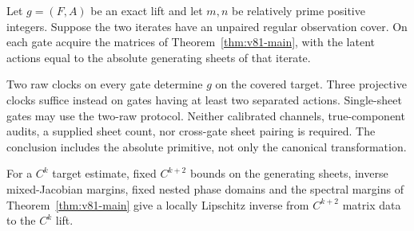 \begin{theorem}
\label{thm:v81-unpaired}
Let $g=(F,A)$ be an exact lift and let $m,n$ be relatively prime positive
integers.  Suppose the two iterates have an unpaired regular observation
cover.  On each gate acquire the matrices of
Theorem~\ref{thm:v81-main}, with the latent actions equal to the absolute
generating sheets of that iterate.

Two raw clocks on every gate determine $g$ on the covered target.  Three
projective clocks suffice instead on gates having at least two separated
actions.  Single-sheet gates may use the two-raw protocol.  Neither
calibrated channels, true-component audits, a supplied sheet count, nor
cross-gate sheet pairing is required.  The conclusion includes the
absolute primitive, not only the canonical transformation.

For a $C^k$ target estimate, fixed $C^{k+2}$ bounds on the generating
sheets, inverse mixed-Jacobian margins, fixed nested phase domains and
the spectral margins of Theorem~\ref{thm:v81-main} give a locally
Lipschitz inverse from $C^{k+2}$ matrix data to the $C^k$ lift.
\end{theorem}
